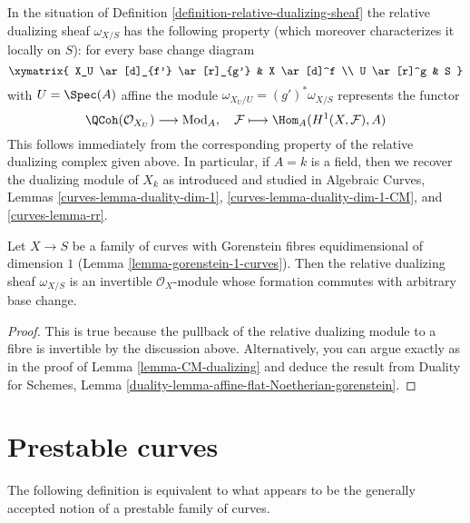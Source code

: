 \noindent
In the situation of Definition \ref{definition-relative-dualizing-sheaf}
the relative dualizing sheaf $\omega_{X/S}$ has the following property
(which moreover characterizes it locally on $S$):
for every base change diagram
$$
\xymatrix{
X_U \ar[d]_{f'} \ar[r]_{g'} & X \ar[d]^f \\
U \ar[r]^g & S
}
$$
with $U = \Spec(A)$ affine the module $\omega_{X_U/U} = (g')^*\omega_{X/S}$
represents the functor
$$
\QCoh(\mathcal{O}_{X_U}) \longrightarrow \text{Mod}_A,\quad
\mathcal{F} \longmapsto \Hom_A(H^1(X, \mathcal{F}), A)
$$
This follows immediately from the corresponding property of the relative
dualizing complex given above. In particular, if $A = k$ is a field,
then we recover the dualizing module of $X_k$ as introduced and studied in
Algebraic Curves, Lemmas \ref{curves-lemma-duality-dim-1},
\ref{curves-lemma-duality-dim-1-CM}, and \ref{curves-lemma-rr}.

\begin{lemma}
\label{lemma-gorenstein-dualizing}
Let $X \to S$ be a family of curves with Gorenstein fibres
equidimensional of dimension $1$ (Lemma \ref{lemma-gorenstein-1-curves}).
Then the relative dualizing sheaf $\omega_{X/S}$ is an
invertible $\mathcal{O}_X$-module whose
formation commutes with arbitrary base change.
\end{lemma}

\begin{proof}
This is true because the pullback of the relative dualizing module
to a fibre is invertible by the discussion above. Alternatively, you
can argue exactly as in the proof of
Lemma \ref{lemma-CM-dualizing} and deduce the result from
Duality for Schemes, Lemma
\ref{duality-lemma-affine-flat-Noetherian-gorenstein}.
\end{proof}









\section{Prestable curves}
\label{section-prestable-curves}

\noindent
The following definition is equivalent to what appears to be the
generally accepted notion of a prestable family of curves.

